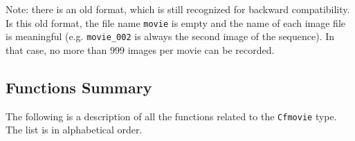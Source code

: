 Note: there is an old format, which is still recognized for backward compatibility. 
Is this old format, the file name \verb+movie+ is empty and the name of each image file is meaningful
(e.g. \verb+movie_002+ is always the second image of the sequence).
In that case, no more than $999$ images per movie can be recorded.

\subsection{Functions Summary}
\label{movies_color-float-movies_function}

The following is a description of all the functions related to 
the \verb+Cfmovie+ type. The list is in alphabetical order.

\newpage %


